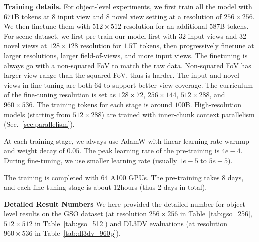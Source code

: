 \noindent\textbf{Training details.}
For object-level experiments, we first train all the model with $671$B tokens at 8 input view and 8 novel view setting at a resolution of $256\times256$. 
We then finetune them with $512\times512$ resolution for an additional $587$B tokens. 
For scene dataset, we first pre-train our model first with 32 input views and 32 novel views at $128\times128$ resolution for $1.5$T tokens, then progressively finetune at larger resolutions, larger field-of-views, and more input views.
The finetuning is always go with a non-squared FoV to match the raw data.
Non-squared FoV has larger view range than the squared FoV, thus is harder.
The input and novel views in fine-tuning are both 64 to support better view coverage.
The curriculum of the fine-tuning resolution is set as $128 \times 72$, $256 \times 144$, $512 \times 288$, and $960 \times 536$.
The training tokens for each stage is around $100$B.
High-resolution models (starting from $512 \times 288$) are trained with inner-chunk context parallelism (Sec.~\ref{sec:parallelism}). 

At each training stage, we always use AdamW with linear learning rate warmup and weight decay of $0.05$.
The peak learning rate of the pre-training is $4e-4$.
During fine-tuning, we use smaller learning rate (usually $1e-5$ to $5e-5$).

The training is completed with 64 A100 GPUs.
The pre-training takes $8$ days, and each fine-tuning stage is about $12$hours (thus 2 days in total).


\noindent\textbf{Detailed Result Numbers}
We here provided the detailed number for object-level  results on the GSO dataset (at resolution $256\times256$ in Table~\ref{tab:gso_256}, $512\times512$ in Table~\ref{tab:gso_512}) and DL3DV evaluations (at resolution $960\times536$ in Table~\ref{tab:dl3dv_960p}).


